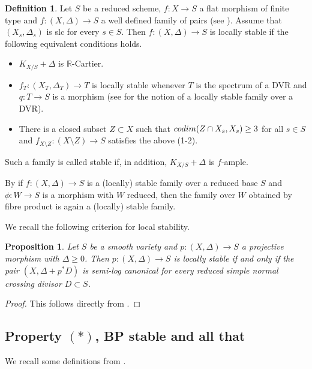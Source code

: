 \documentclass[12pt]{amsart}
\theoremstyle{plain}
\newtheorem{proposition}[theorem]{Proposition}
\theoremstyle{definition}
\newtheorem{definition}[theorem]{Definition}
\def\RR{\mathbb R}
\def\rar{\rightarrow}
\def\K#1.{K_{#1}}
\begin{document}
\begin{definition} \label{def_stable}
Let $S$ be a reduced scheme, $f\colon X \rightarrow S$ a flat morphism of finite type and 
$f\colon (X, \Delta) \rightarrow S$ a well defined family of pairs (see \cite[Definition-Theorem 4.7]{Kollar21}).
Assume that $(X_s, \Delta_s)$ is slc for every $s \in S$.  Then $f\colon (X, \Delta) \rightarrow S$
is locally stable if the following equivalent conditions holds.

\begin{itemize}
\item[(1)] $\K X/S. + \Delta$ is $\RR$-Cartier.
\item[(2)] $f_T \colon (X_T,\Delta_T) \rar T$ is locally stable whenever $T$ is the spectrum of a DVR and 
$q \colon T \rar S$ is a morphism (see \cite[Definition-Theorem 2.3]{Kollar21} for the notion of a locally stable
family over a DVR).
\item[(3)] There is a closed subset $Z \subset X$ such that ${\rm codim} (Z \cap X_s, X_s) \geq 3$ for 
all $s \in S$ and $f_{X \setminus Z}\colon (X\setminus Z) \rightarrow S$ satisfies the above (1-2). 
\end{itemize}
Such a family is called stable if, in addition, $\K X/S. + \Delta$ is $f$-ample.
\end{definition}



By \cite[Theorem 4.8]{Kollar21} 
if $f \colon (X,\Delta) \rar S$ is a (locally) stable family over a reduced base $S$ 
and $\phi \colon W \rar S$ is a morphism with $W$ reduced, then the family over $W$ 
obtained by fibre product is again a (locally) stable family.


We recall the following criterion for local stability.
\begin{proposition}
\label{prop_kollar_criterion}
Let $S$ be a smooth variety and $p\colon (X, \Delta) \rightarrow S$ a projective morphism with $\Delta \geq 0$.
Then $p\colon (X, \Delta) \rightarrow S$ is locally stable if and only if the pair $(X, \Delta+p^*D)$
is semi-log canonical for every reduced simple normal crossing divisor $D \subset S$.
\end{proposition}
\begin{proof}
This follows directly from
\cite[Corollary 4.55]{Kollar21}.
\end{proof}

\subsection{Property $(*)$, BP stable and all that}
\label{s_prop_*}
We recall some definitions from \cite{ACSS}.
\end{document}
